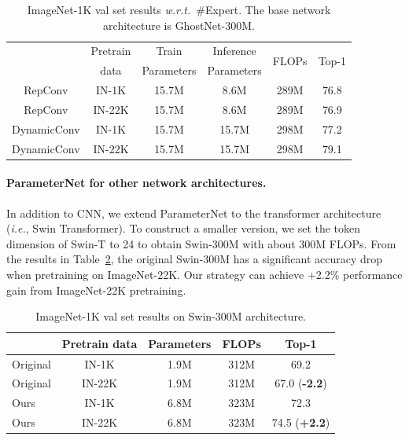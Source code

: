 \documentclass{article}
\newcommand{\ie}{\emph{i.e.}}
\newcommand{\wrt}{\emph{w.r.t.}}
\begin{document}
\begin{table}[htb]
	\centering
	\renewcommand\arraystretch{1.05}
	\caption{ImageNet-1K val set results \wrt~\#Expert. The base network architecture is GhostNet-300M.}
	\label{tab:rep}
	\begin{tabular}{c|c|cccc}
		\hline
		 & Pretrain  & Train  & Inference & \multirow{2}{*}{FLOPs} & \multirow{2}{*}{Top-1}  \\
		 & data & Parameters & Parameters & & \\
		\hline
		RepConv & IN-1K &  15.7M & 8.6M & 289M & 76.8 \\
		RepConv & IN-22K &  15.7M & 8.6M & 289M & 76.9 \\
		DynamicConv & IN-1K & 15.7M & 15.7M & 298M & 77.2 \\
		DynamicConv & IN-22K & 15.7M & 15.7M & 298M & 79.1 \\
		\hline
	\end{tabular}	
\end{table}


\paragraph{ParameterNet for other network architectures.}
In addition to CNN, we extend ParameterNet to the transformer architecture (\ie, Swin Transformer). To construct a smaller version, we set the token dimension of Swin-T to 24 to obtain Swin-300M with about 300M FLOPs. From the results in Table~\ref{tab:swin}, the original Swin-300M has a significant accuracy drop when pretraining on ImageNet-22K. Our strategy can achieve +2.2\% performance gain from ImageNet-22K pretraining.

\begin{table}[htb]
	\centering
	\renewcommand\arraystretch{1.05}
	\caption{ImageNet-1K val set results on Swin-300M architecture.}
	\label{tab:swin}
	\begin{tabular}{l|c|ccc}
		\hline
		 & Pretrain data  & Parameters & FLOPs & Top-1  \\
		\hline
		Original & IN-1K &  1.9M & 312M & 69.2 \\
		Original & IN-22K &  1.9M & 312M & 67.0 (\textbf{\color{red}-2.2}) \\
		Ours & IN-1K &  6.8M & 323M & 72.3 \\
		Ours & IN-22K &  6.8M & 323M & 74.5 (\textbf{\color{green}+2.2}) \\
		\hline
	\end{tabular}	
\end{table}
\end{document}
